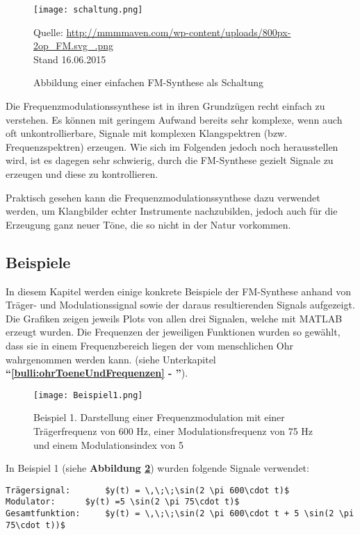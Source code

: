 \begin{figure} [ht]
\centering
  \texttt{[image: schaltung.png]}
\caption{Abbildung einer einfachen FM-Synthese als Schaltung}
\label{fig:schaltung}
Quelle: \url{http://mmmmaven.com/wp-content/uploads/800px-2op_FM.svg_.png} 
\\Stand 16.06.2015
\end{figure}

Die Frequenzmodulationssynthese ist in ihren Grundzügen recht einfach zu verstehen. Es können mit geringem Aufwand bereits sehr komplexe, wenn auch oft unkontrollierbare, Signale mit komplexen Klangspektren (bzw. Frequenzspektren) erzeugen. Wie sich im Folgenden jedoch noch herausstellen wird, ist es dagegen sehr schwierig, durch die FM-Synthese gezielt Signale zu erzeugen und diese zu kontrollieren.

Praktisch gesehen kann die Frequenzmodulationssynthese dazu verwendet werden, um Klangbilder echter Instrumente nachzubilden, jedoch auch für die Erzeugung ganz neuer Töne, die so nicht in der Natur vorkommen.

\FloatBarrier
\subsection{Beispiele}
In diesem Kapitel werden einige konkrete Beispiele der FM-Synthese anhand von Träger- und Modulationssignal sowie der daraus resultierenden Signals aufgezeigt. Die Grafiken zeigen jeweils Plots von allen drei Signalen, welche mit MATLAB erzeugt wurden.
Die Frequenzen der jeweiligen Funktionen wurden so gewählt, dass sie in einem Frequenzbereich liegen der vom menschlichen Ohr wahrgenommen werden kann. (siehe Unterkapitel \textbf{``\ref{bulli:ohrToeneUndFrequenzen} - ''}).

\begin{figure} [ht]
\centering
  \texttt{[image: Beispiel1.png]}
\caption{Beispiel 1. Darstellung einer Frequenzmodulation mit einer Trägerfrequenz von 600 Hz, einer Modulationsfrequenz von 75 Hz und einem Modulationsindex von 5 }
\label{fig:beispiel1}
\end{figure}

In Beispiel 1 (siehe \textbf{Abbildung \ref{fig:beispiel1}})  wurden folgende Signale verwendet:

\begin{lstlisting}[mathescape]
Trägersignal: 		$y(t) = \,\;\;\sin(2 \pi 600\cdot t)$
Modulator:		$y(t) =5 \sin(2 \pi 75\cdot t)$
Gesamtfunktion: 	$y(t) = \,\;\;\sin(2 \pi 600\cdot t + 5 \sin(2 \pi 75\cdot t))$
\end{lstlisting}

